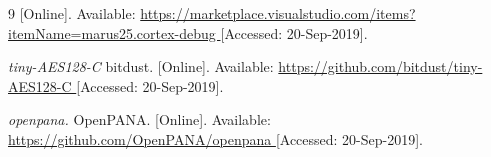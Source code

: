 \begin{thebibliography}{9}
[Online]. Available:
\url{
https://marketplace.visualstudio.com/items?itemName=marus25.cortex-debug
}
[Accessed: 20-Sep-2019].





\textit{
tiny-AES128-C
}
bitdust.
[Online]. Available:
\url{
https://github.com/bitdust/tiny-AES128-C
}
[Accessed: 20-Sep-2019].



\textit{
openpana.
}
OpenPANA.
[Online]. Available:
\url{
https://github.com/OpenPANA/openpana
}
[Accessed: 20-Sep-2019].































































\end{thebibliography}
